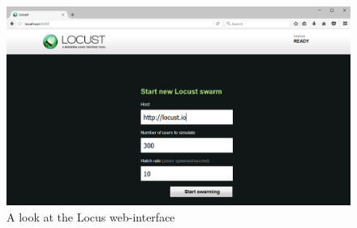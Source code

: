 \begin{figure}[H]
	\includegraphics[width=\linewidth]{./Images/Implementation/locust_interface.png}
	\caption{A look at the Locus web-interface}
\end{figure}
\newpage
